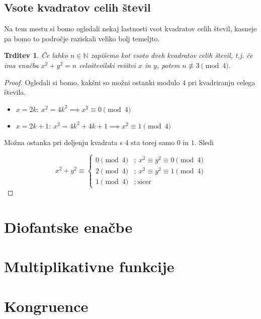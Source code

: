 \documentclass[12pt, a4paper]{article}
\newtheorem{trd}{Trditev}
\begin{document}
\subsection{Vsote kvadratov celih števil}

Na tem mestu si bomo ogledali nekaj lastnosti vsot kvadratov celih števil, kasneje pa bomo to področje raziskali veliko bolj temeljto.

\begin{trd}
Če lahko $n\in \mathbb{N}$ zapišemo kot vsoto dveh kvadratov celih števil, t.j. če ima enačba $x^2 + y^2 = n$ celoštevilski rešitvi $x$ in $y$, potem $n\not\equiv 3 \pmod{4}$.
\end{trd}

\begin{proof}
Ogledali si bomo, kakšni so možni ostanki modulo $4$ pri kvadriranju celega števila.
\begin{itemize}
\item $x=2k:\ x^2 = 4k^2 \implies x^2 \equiv 0 \pmod4$
\item $x=2k+1:\ x^2= 4k^2 + 4k + 1 \implies x^2 \equiv 1 \pmod4$
\end{itemize}
Možna ostanka pri deljenju kvadrata s $4$ sta torej samo $0$ in $1$. Sledi

\[
x^2 + y^2\equiv
\begin{cases}
0 \pmod4 &;\ x^2\equiv y^2 \equiv 0 \pmod4 \\
2 \pmod4 &;\ x^2\equiv y^2 \equiv 1 \pmod4 \\
1 \pmod4 &;\ \text{sicer}
\end{cases}
\]
\end{proof}

















\section{Diofantske enačbe}
\section{Multiplikativne funkcije}
\section{Kongruence} \label{kongruence}
\end{document}
